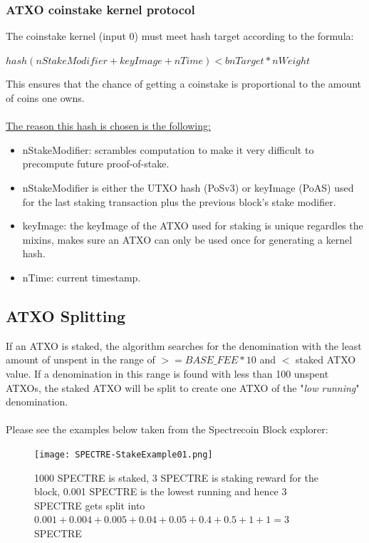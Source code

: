 \subsubsection{ATXO coinstake kernel protocol}
The coinstake kernel (input 0) must meet hash target according to the formula:



\vspace{5mm} %
$ hash(nStakeModifier + keyImage + nTime) < bnTarget * nWeight  $
\vspace{5mm} %

\noindent
This ensures that the chance of getting a coinstake is proportional to
the amount of coins one owns.
\\
\\
\noindent
\underline{The reason this hash is chosen is the following:}
\begin{itemize}
	\item nStakeModifier: scrambles computation to make it very difficult
	to precompute future proof-of-stake.
	\item nStakeModifier is either the UTXO hash (PoSv3) or keyImage (PoAS) 
	used for the last staking transaction plus the previous block's stake 
	modifier.
	\item keyImage: the keyImage of the ATXO used for staking is unique 
	regardles the mixins, makes sure an ATXO can only be used once for 
	generating a kernel hash.
	\item nTime: current timestamp.
\end{itemize}



\subsection{ATXO Splitting}
If an ATXO is staked, the algorithm searches for the denomination with the
least amount of unspent in the range of  $>= BASE\_FEE * 10$ and $<$ staked
ATXO value. If a denomination in this range is found with less than 100
unspent ATXOs, the staked ATXO will be split to create one ATXO of the
"\textit{low running}" denomination.
\\
\\
\noindent
Please see the examples below taken from the Spectrecoin Block explorer:

\begin{figure}[ht]
	
	\centering
	\texttt{[image: SPECTRE-StakeExample01.png]}
	\caption{1000 SPECTRE is staked, 3 SPECTRE is staking reward for the 
	block, 0.001 SPECTRE is the lowest running and hence 3 SPECTRE gets 
	split into $0.001 + 0.004 + 0.005 + 0.04 + 0.05 + 0.4 + 0.5 + 1 + 1 = 3$ SPECTRE}
\end{figure}
\newpage



